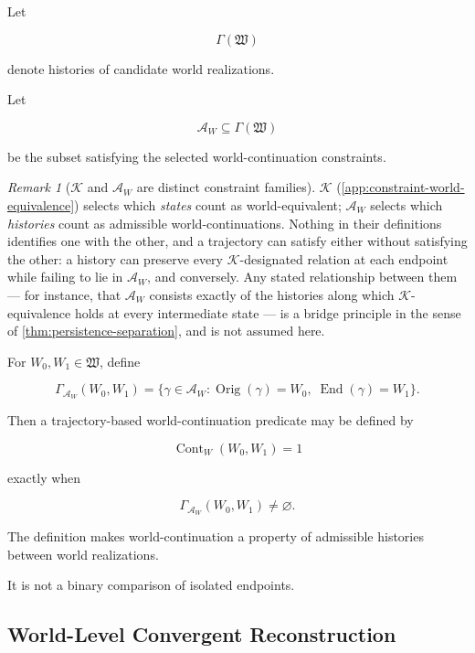 \documentclass[
  11pt,
  a4paper,
  DIV=12,
  BCOR=0mm,
  parskip=half-
]{scrartcl}
\newcommand{\End}{\operatorname{End}}
\newcommand{\Orig}{\operatorname{Orig}}
\newcommand{\Cont}{\operatorname{Cont}}
\theoremstyle{definition}
\theoremstyle{plain}
\theoremstyle{remark}
\newtheorem{remark}[definition]{Remark}
\begin{document}
Let

\[
  \Gamma(\mathfrak W)
\]

denote histories of candidate world realizations.

Let

\[
  \mathcal A_W
  \subseteq
  \Gamma(\mathfrak W)
\]

be the subset satisfying the selected world-continuation constraints.

\begin{remark}[\(\mathcal K\) and \(\mathcal A_W\) are distinct constraint families]
\label{rem:K-vs-AW}
\(\mathcal K\) (\cref{app:constraint-world-equivalence}) selects which
\emph{states} count as world-equivalent; \(\mathcal A_W\) selects which
\emph{histories} count as admissible world-continuations. Nothing in their
definitions identifies one with the other, and a trajectory can satisfy
either without satisfying the other: a history can preserve every
\(\mathcal K\)-designated relation at each endpoint while failing to lie in
\(\mathcal A_W\), and conversely. Any stated relationship between them —
for instance, that \(\mathcal A_W\) consists exactly of the histories along
which \(\mathcal K\)-equivalence holds at every intermediate state — is a
bridge principle in the sense of \cref{thm:persistence-separation}, and is
not assumed here.
\end{remark}

For \(W_0,W_1\in\mathfrak W\), define

\[
  \Gamma_{\mathcal A_W}(W_0,W_1)
  =
  \{
    \gamma\in\mathcal A_W:
    \Orig(\gamma)=W_0,\;
    \End(\gamma)=W_1
  \}.
\]

Then a trajectory-based world-continuation predicate may be defined by

\[
  \Cont_W(W_0,W_1)
  =
  1
\]

exactly when

\[
  \Gamma_{\mathcal A_W}(W_0,W_1)
  \neq
  \varnothing.
\]

The definition makes world-continuation a property of admissible histories
between world realizations.

It is not a binary comparison of isolated endpoints.


\subsection{World-Level Convergent Reconstruction}
\label{app:world-convergent-reconstruction}
\end{document}
